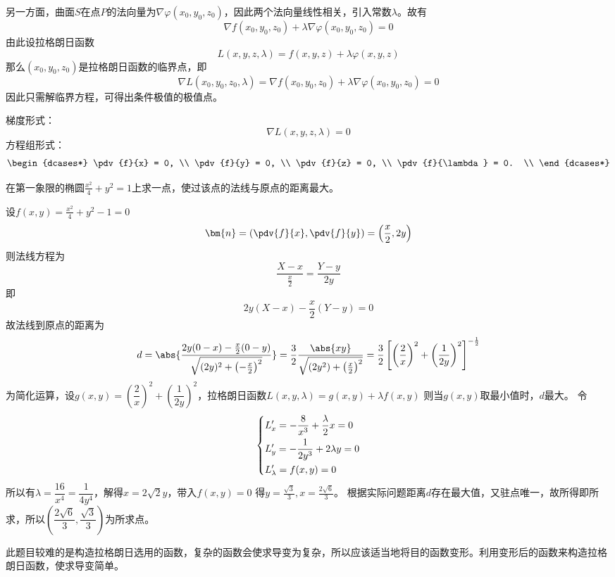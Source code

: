 另一方面，曲面$S$在点$P$的法向量为$\nabla\varphi(x_0,y_0,z_0)$，因此两个法向量线性相关，引入常数$\lambda$。故有
\[ \nabla f(x_0,y_0,z_0) + \lambda\nabla\varphi(x_0,y_0,z_0) = 0 \]
由此设拉格朗日函数
\begin{equation}
    \label{eq:拉格朗日函数}
    L(x,y,z,\lambda) = f(x,y,z) + \lambda\varphi(x,y,z)
\end{equation}
那么$(x_0,y_0,z_0)$是拉格朗日函数的临界点，即
\[ \nabla L(x_0,y_0,z_0,\lambda) = \nabla f(x_0,y_0,z_0) + \lambda\nabla\varphi(x_0,y_0,z_0) = 0 \]
因此只需解临界方程，可得出条件极值的极值点。

梯度形式：
\begin{equation}
    \label{eq:拉格朗日临界方程}
    \nabla L(x,y,z,\lambda) = 0
\end{equation}
方程组形式：
\begin{equation}
    \begin{dcases*}
        \pdv{f}{x} = 0,       \\
        \pdv{f}{y} = 0,       \\
        \pdv{f}{z} = 0,       \\
        \pdv{f}{\lambda} = 0. \\
    \end{dcases*}
\end{equation}

\begin{example}
    在第一象限的椭圆$\frac{x^2}{4} + y^2 = 1$上求一点，使过该点的法线与原点的距离最大。
\end{example}
\begin{solution}
    设$f(x,y) = \frac{x^2}{4} + y^2 - 1 = 0$
    \[ \bm{n} = \left(\pdv{f}{x}, \pdv{f}{y}\right) = \left(\frac{x}{2}, 2y\right) \]
    则法线方程为
    \[ \frac{X - x}{\frac{x}{2}} = \frac{Y - y}{2y} \]
    即
    \[ 2y(X-x)-\frac{x}{2}(Y-y) = 0 \]
    故法线到原点的距离为
    \[
        d
        = \abs{\frac{2y(0-x)-\frac{x}{2}(0-y)}{\sqrt{(2y)^2 + \left(-\frac{x}{2}\right)^2}}}
        = \frac{3}{2}\frac{\abs{xy}}{\sqrt{(2y^2)+\left(\frac{x}{2}\right)^2}}
        = \frac{3}{2} \left[\left(\frac{2}{x}\right)^2 + \left(\frac{1}{2y}\right)^2\right]^{-\frac{1}{2}}
    \]
    为简化运算，设$g(x,y) = (\dfrac{2}{x})^2 + (\dfrac{1}{2y})^2$，拉格朗日函数$L(x,y,\lambda) = g(x,y) + \lambda f(x,y)$
    则当$g(x,y)$取最小值时，$d$最大。
    令
    \[
        \begin{dcases}
            L'_x = -\frac{8}{x^3} + \frac{\lambda}{2} x = 0 \\
            L'_y = -\frac{1}{2y^3} + 2\lambda y = 0         \\
            L'_\lambda = f(x,y)=0
        \end{dcases}
    \]
    所以有$\lambda = \dfrac{16}{x^4} = \dfrac{1}{4y^4}$，解得$x=2\sqrt{2}y$，带入$f(x,y)=0$
    得$y = \frac{\sqrt{3}}{3},x=\frac{2\sqrt{6}}{3}$。
    根据实际问题距离$d$存在最大值，又驻点唯一，故所得即所求，所以$\left(\dfrac{2\sqrt{6}}{3}, \dfrac{\sqrt{3}}{3}\right)$为所求点。
\end{solution}

此题目较难的是构造拉格朗日选用的函数，复杂的函数会使求导变为复杂，所以应该适当地将目的函数变形。利用变形后的函数来构造拉格朗日函数，使求导变简单。